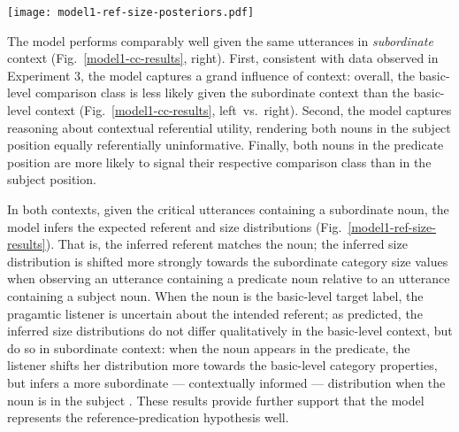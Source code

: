 \begin{figure*}[t]
	\begin{center}
		\texttt{[image: model1-ref-size-posteriors.pdf]}
	\end{center}
	\vspace{-0.3cm}
	\caption{Qualitative predictions made by the refpred-RSA model: Given the utterance "That Great Dane is big", the pragmatic listener infers a large-subordinate size distribution (middle) and is certain that the referent is a Great Dane (left). Given the utterance "That's a big Great Dane", the pragmatic listener shifts her size distribution even more towards large size values (right), and is again certain about the referent (left).}
	\label{model1-ref-size-results}
\end{figure*}
The model performs comparably well given the same utterances in \emph{subordinate} context (Fig.~\ref{model1-cc-results}, right). First, consistent with data observed in Experiment 3, the model captures a grand influence of context: overall, the basic-level comparison class is less likely given the subordinate context than the basic-level context (Fig.~\ref{model1-cc-results}, left~vs.~right). Second, the model captures reasoning about contextual referential utility, rendering both nouns in the subject position equally referentially uninformative. Finally, both nouns in the predicate position are more likely to signal their respective comparison class than in the subject position.

In both contexts, given the critical utterances containing a subordinate noun, the model infers the expected referent and size distributions (Fig.~\ref{model1-ref-size-results}). That is, the inferred referent matches the noun; the inferred size distribution is shifted more strongly towards the subordinate category size values when observing an utterance containing a predicate noun relative to an utterance containing a subject noun. When the noun is the basic-level target label, the pragamtic listener is uncertain about the intended referent; as predicted, the inferred size distributions do not differ qualitatively in the basic-level context, but do so in subordinate context: when the noun appears in the predicate, the listener shifts her distribution more towards the basic-level category properties, but infers a more subordinate --- contextually informed --- distribution when the noun is in the subject . These results provide further support that the model represents the reference-predication hypothesis well.

